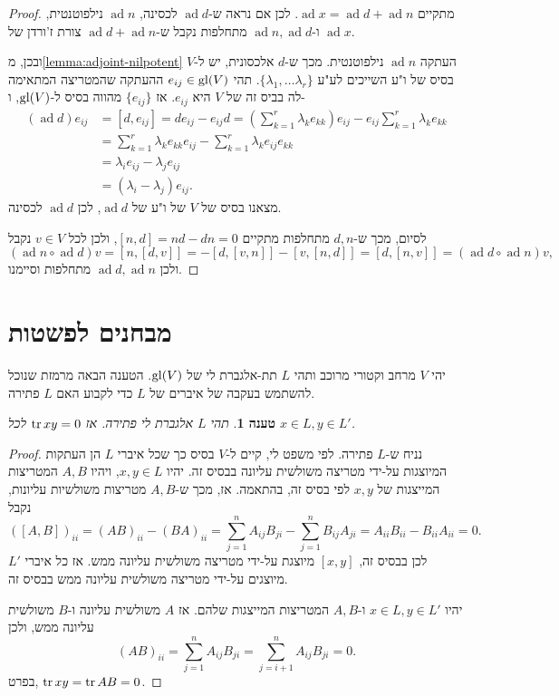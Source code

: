 \documentclass{report}
\theoremstyle{break}
\newtheorem{preposition}[preposition]{טענה}
\theoremstyle{MyNonumberbreak}
\newtheorem{proof}{הוכחה}
\DeclareMathOperator{\ad}{ad} %
\begin{document}
\begin{proof}
	מתקיים $\ad x = \ad d + \ad n$. לכן אם נראה ש-$\ad d$ לכסינה, $\ad n$ נילפוטנטית, ו-$\ad n, \ad d$ מתחלפות נקבל ש-$\ad d + \ad n$ צורת ז'ורדן של $\ad x$.
	
	ובכן, מ\autoref*{lemma:adjoint-nilpotent} העתקה $\ad n$ נילפוטנטית. מכך ש-$d$ אלכסונית, יש ל-$V$ בסיס של ו"ע השייכים לע"ע $\{\lambda_1, \ldots \lambda_r\}$. תהי $e_{ij} \in \operatorname{gl}(V)$ ההעתקה שהמטריצה המתאימה לה בביס זה של $V$ היא $e_{ij}$. אז $\{e_{ij}\}$ מהווה בסיס ל-$\operatorname{gl}(V)$, ו-
	\begin{align*}
		(\ad d)e_{ij} &= [d, e_{ij}] = de_{ij} - e_{ij}d = (\sum_{k=1}^r \lambda_k e_{kk}) e_{ij} - e_{ij} \sum_{k=1}^r \lambda_k e_{kk} \\
			&= \sum_{k=1}^r \lambda_k e_{kk}e_{ij} - \sum_{k=1}^r \lambda_k e_{ij}e_{kk} \\
			&= \lambda_i e_{ij} - \lambda_j e_{ij} \\
			&= (\lambda_i - \lambda_j)e_{ij}.
	\end{align*}
	מצאנו בסיס של $V$ של ו"ע של $\ad d$, לכן $\ad d$ לכסינה.
	
	לסיום, מכך ש-$d, n$ מתחלפות מתקיים $[n, d] = nd - dn = 0$, ולכן לכל $v \in V$ נקבל
	\[ (\ad n \circ \ad d)v = [n, [d, v]] = -[d, [v, n]] - [v, [n, d]] = [d, [n, v]] = (\ad d \circ \ad n)v, \]
	ולכן $\ad d, \ad n$ מתחלפות וסיימנו.
\end{proof}

\section{מבחנים לפשטות}
יהי $V$ מרחב וקטורי מרוכב ותהי $L$ תת-אלגברת לי של $\operatorname{gl}(V)$. הטענה הבאה מרמזת שנוכל להשתמש בעקבה של איברים של $L$ כדי לקבוע האם $L$ פתירה.
\begin{preposition} \label{prep:necessary-solvable-tr}
	תהי $L$ אלגברת לי פתירה. אז $\operatorname{tr} xy = 0$ לכל $x \in L, y \in L'$.
\end{preposition}
\begin{proof}
	נניח ש-$L$ פתירה. לפי משפט לי, קיים ל-$V$ בסיס כך שכל איברי $L$ הן העתקות המיוצגות על-ידי מטריצה משולשית עליונה בבסיס זה. יהיו $x, y \in L$, ויהיו $A, B$ המטריצות המייצגות של $x, y$ לפי בסיס זה, בהתאמה. אז, מכך ש-$A, B$ מטריצות משולשיות עליונות, נקבל
	\[ ([A, B])_{ii} = (AB)_{ii} - (BA)_{ii} = \sum_{j=1}^n A_{ij} B_{ji} - \sum_{j=1}^n B_{ij} A_{ji} = A_{ii}B_{ii} - B_{ii}A_{ii} = 0. \]
	לכן בבסיס זה, $[x, y]$ מיוצגת על-ידי מטריצה משולשית עליונה ממש. אז כל איברי $L'$ מיוצגים על-ידי מטריצה משולשית עליונה ממש בבסיס זה.
	
	יהיו $x \in L, y \in L'$ ו-$A, B$ המטריצות המייצגות שלהם. אז $A$ משולשית עליונה ו-$B$ משולשית עליונה ממש, ולכן
	\[ (AB)_{ii} = \sum_{j=1}^n A_{ij} B_{ji} = \sum_{j=i+1}^n A_{ij} B_{ji} = 0. \]
	בפרט, $\operatorname{tr} xy = \operatorname{tr} AB = 0$.
\end{proof}
\end{document}
